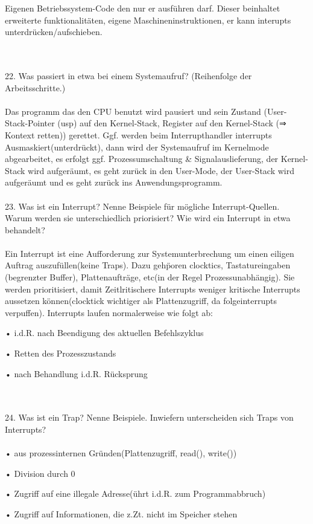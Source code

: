 \documentclass{article}
\begin{document}
Eigenen Betriebssystem-Code den nur er ausf\"uhren darf. Dieser beinhaltet erweiterte funktionalit\"aten, eigene Maschineninstruktionen, er kann interupts unterdr\"ucken/aufschieben.

\\
\\
22. Was passiert in etwa bei einem Systemaufruf? (Reihenfolge der Arbeitsschritte.)
\\
\\
Das programm das den CPU benutzt wird pausiert und sein Zustand (User-Stack-Pointer (usp) auf den Kernel-Stack,
Register auf den Kernel-Stack (⇒ Kontext retten)) gerettet. Ggf. werden beim Interrupthandler interrupts Ausmaskiert(unterdr\"uckt), dann wird der Systemaufruf im Kernelmode abgearbeitet, es erfolgt ggf. Prozessumschaltung & Signalauslieferung, der Kernel-Stack wird aufgeräumt, es geht zur\"uck in den User-Mode, der User-Stack wird aufgeräumt und es geht zurück ins Anwendungsprogramm.
\\
\\
23. Was ist ein Interrupt? Nenne Beispiele für mögliche Interrupt-Quellen. Warum werden sie
unterschiedlich priorisiert? Wie wird ein Interrupt in etwa behandelt?
\\
\\
Ein Interrupt ist eine Aufforderung zur Systemunterbrechung um einen eiligen Auftrag auszuf\"ullen(keine Traps). Dazu geh\"poren clocktics, Tastatureingaben (begrenzter Buffer), Plattenauftr\"age, etc(in der Regel Prozessunabh\"angig). Sie werden prioritisiert, damit Zeitlritischere Interrupts weniger kritische Interrupts aussetzen k\"onnen(clocktick wichtiger als Plattenzugriff, da folgeinterrupts verpuffen). Interrupts laufen normalerweise wie folgt ab:

• i.d.R. nach Beendigung des aktuellen Befehlszyklus

• Retten des Prozesszustands

• nach Behandlung i.d.R. Rücksprung

\\
\\
24. Was ist ein Trap? Nenne Beispiele. Inwiefern unterscheiden sich Traps von Interrupts?
\\
\\
• aus prozessinternen Gründen(Plattenzugriff, read(), write())

• Division durch 0

• Zugriff auf eine illegale Adresse(ührt i.d.R. zum Programmabbruch)

• Zugriff auf Informationen, die z.Zt. nicht im Speicher stehen
\end{document}
